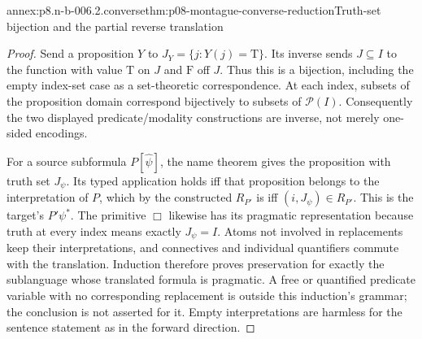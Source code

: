 \begin{annexitem}{annex:p8.n-b-006.2.converse}{thm:p08-montague-converse-reduction}{Truth-set bijection and the partial reverse translation}
\begin{proof}
Send a proposition \(Y\) to \(J_Y=\{j:Y(j)=\mathrm T\}\).
Its inverse sends \(J\subseteq I\) to the function with value
\(\mathrm T\) on \(J\) and \(\mathrm F\) off \(J\).
Thus this is a bijection, including the empty index-set case as a
set-theoretic correspondence. At each index, subsets of the proposition
domain correspond bijectively to subsets of \(\mathcal P(I)\).
Consequently the two displayed predicate/modality constructions are
inverse, not merely one-sided encodings.

For a source subformula \(P[\widehat\psi]\), the name theorem gives
the proposition with truth set \(J_\psi\). Its typed application
holds iff that proposition belongs to the interpretation of \(P\),
which by the constructed \(R_{P'}\) is iff
\((i,J_\psi)\in R_{P'}\). This is the target's \(P'\psi^*\).
The primitive \(\Box\) likewise has its pragmatic representation
because truth at every index means exactly \(J_\psi=I\).
Atoms not involved in replacements keep their interpretations, and
connectives and individual quantifiers commute with the translation.
Induction therefore proves preservation for exactly the sublanguage
whose translated formula is pragmatic. A free or quantified predicate
variable with no corresponding replacement is outside this induction's
grammar; the conclusion is not asserted for it. Empty interpretations
are harmless for the sentence statement as in the forward direction.
\end{proof}
\end{annexitem}

